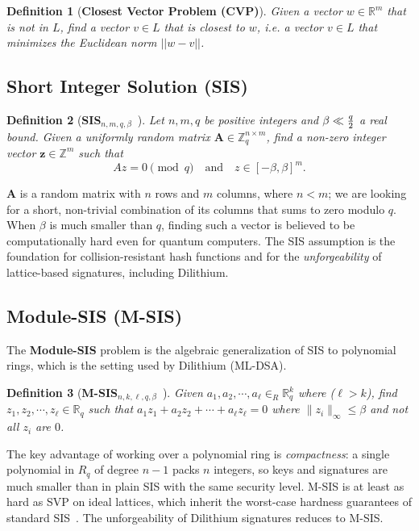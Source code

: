 \documentclass[binding=0.6cm,oneside,noexaminfo]{sapthesis}
\newtheorem{definition}{Definition}
\begin{document}
\begin{definition}[\textbf{Closest Vector Problem (CVP)}]
  Given a vector $w \in \mathbb{R}^m$ that is not
  in $L$, find a vector $v \in L$ that is closest to $w$, i.e. a vector $v \in L$ that minimizes 
  the Euclidean norm $||w-v||$.
\end{definition}

\subsection{Short Integer Solution (SIS)}
\label{sis}

\begin{definition}[\textbf{SIS}$_{n,m,q,\beta}$~\cite{Ajtai1996Generating}]
  Let $n, m, q$ be positive integers and $\beta \ll {q\over 2}$ a real bound. Given a uniformly random matrix $\mathbf{A} \in \mathbb{Z}_q^{n \times m}$, find a \emph{non-zero} integer vector $\mathbf{z} \in \mathbb{Z}^m$ such that
  $$Az = 0 \pmod{q} \quad \text{and} \quad z \in [-\beta, \beta]^m.$$
\end{definition}

$\mathbf{A}$ is a random matrix with $n$ rows and $m$ columns, where $n < m$; we are looking for a short, non-trivial combination of its columns that sums to zero modulo $q$. When $\beta$ is much smaller than $q$, finding such a vector is believed to be computationally hard even for quantum computers. The SIS assumption is the foundation for collision-resistant hash functions 
and for the \emph{unforgeability} of lattice-based signatures, including Dilithium.

\subsection{Module-SIS (M-SIS)}
\label{msis}

The \textbf{Module-SIS} problem is the algebraic generalization of SIS to polynomial rings, which is the setting used by Dilithium (ML-DSA).

\begin{definition}[\textbf{M-SIS}$_{n,k,\ell,q,\beta}$~\cite{Langlois2015Worst}]
  Given $a_1,a_2,\cdots,a_{\ell}\in_{R}\mathbb{R}^k_q$ where ($\ell > k$), find $z_1,z_2,\cdots,z_{\ell}\in \mathbb{R}_q$ such
  that $a_1z_1 + a_2z_2 + \cdots + a_{\ell}z_{\ell} = 0$ where $\|z_i\|_{\infty} \le \beta$ and
  not all $z_i$ are $0$.
\end{definition}

The key advantage of working over a polynomial ring is \emph{compactness}: a single polynomial in $R_q$ of degree $n-1$ packs $n$ integers, so keys and signatures are much smaller than in plain SIS with the same security level. M-SIS is at least as hard as SVP on ideal lattices, which inherit the worst-case hardness guarantees of standard SIS~\cite{Langlois2015Worst}. The unforgeability of Dilithium signatures reduces to M-SIS.
\end{document}
